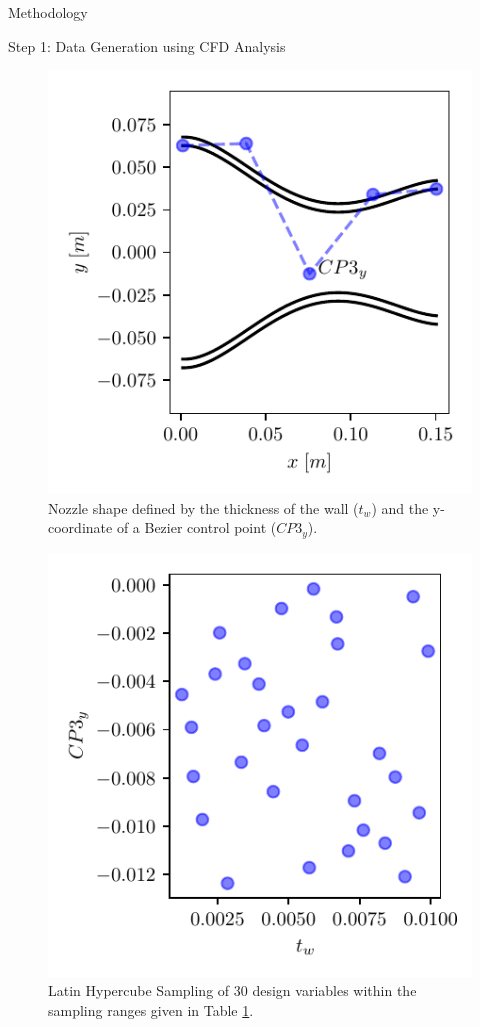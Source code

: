 \begin{frame}{Methodology}
\begin{block}{Step 1: Data Generation using CFD Analysis}
\begin{figure}
\hypertarget{fig:nozzle_shape}{%
\centering
\includegraphics{figures/nozzle_shape.pdf}
\caption{Nozzle shape defined by the thickness of the wall (\(t_w\)) and
the y-coordinate of a Bezier control point
(\(CP3_y\)).}\label{fig:nozzle_shape}
}
\end{figure}

\begin{figure}
\hypertarget{fig:lhs}{%
\centering
\includegraphics{figures/lhs_sampling.pdf}
\caption{Latin Hypercube Sampling of 30 design variables within the
sampling ranges given in Table
\protect\hyperlink{tab:lhs}{1}.}\label{fig:lhs}
}
\end{figure}


\end{block}
\end{frame}
